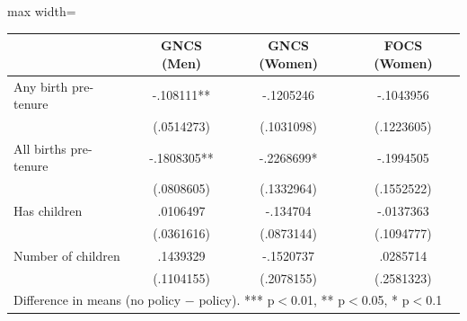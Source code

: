 \begin{adjustbox}{max width=\textwidth}
\begin{tabular}{lccc}
\toprule
 & GNCS (Men) & GNCS (Women) & FOCS (Women) \\
\midrule
Any birth pre-tenure & -.108111** & -.1205246 & -.1043956 \\
 & (.0514273) & (.1031098) & (.1223605) \\[0.3em]
All births pre-tenure & -.1808305** & -.2268699* & -.1994505 \\
 & (.0808605) & (.1332964) & (.1552522) \\[0.3em]
Has children & .0106497 & -.134704 & -.0137363 \\
 & (.0361616) & (.0873144) & (.1094777) \\[0.3em]
Number of children & .1439329 & -.1520737 & .0285714 \\
 & (.1104155) & (.2078155) & (.2581323) \\[0.3em]
\bottomrule
\multicolumn{4}{l}{\footnotesize Difference in means (no policy $-$ policy). *** p$<$0.01, ** p$<$0.05, * p$<$0.1} \\
\end{tabular}
\end{adjustbox}
